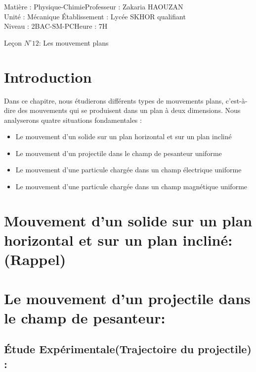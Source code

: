 \documentclass[12pt]{article}
\author{Zakaria HAOUZAN}
\date{\today}
\newcommand\headerMe[2]{\noindent{}#1\hfill#2}
\begin{document}
\headerMe{Matière : Physique-Chimie}{Professeur : Zakaria HAOUZAN}\\
\headerMe{Unité : Mécanique }{Établissement : Lycée SKHOR qualifiant}\\
\headerMe{Niveau : 2BAC-SM-PC}{Heure : 7H}\\

\begin{center}

    \Large{Leçon $N^{\circ} 12 $: \color{red} Les mouvement plans}
\end{center}



\section{Introduction }
Dans ce chapitre, nous étudierons différents types de mouvements plans, c'est-à-dire des mouvements qui se produisent dans un plan à deux dimensions. Nous analyserons quatre situations fondamentales :

\begin{itemize}
  \item Le mouvement d'un solide sur un plan horizontal et sur un plan incliné
  \item Le mouvement d'un projectile dans le champ de pesanteur uniforme
  \item Le mouvement d'une particule chargée dans un champ électrique uniforme
  \item Le mouvement d'une particule chargée dans un champ magnétique uniforme
\end{itemize}

\section{Mouvement d'un solide sur un plan horizontal et sur un plan incliné:(Rappel)}
\section{Le mouvement d'un projectile dans le champ de pesanteur:}

\subsection{Étude Expérimentale(Trajectoire du projectile) : }
\end{document}
